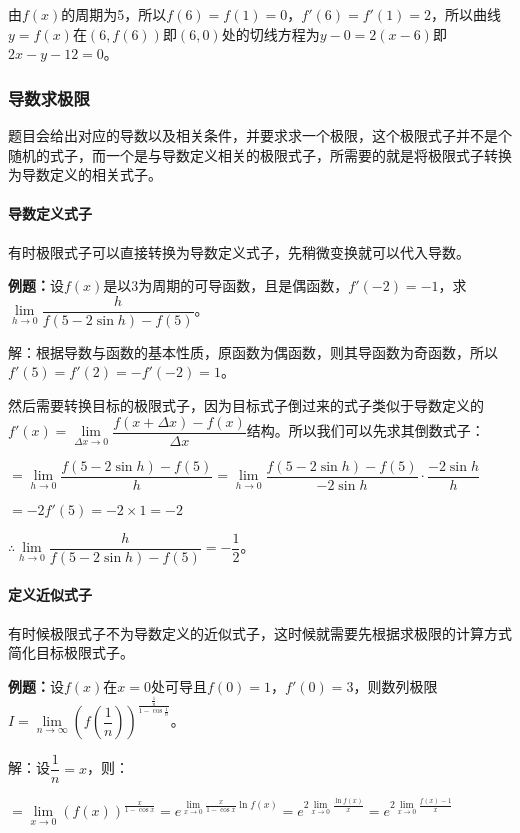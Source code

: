 由$f(x)$的周期为5，所以$f(6)=f(1)=0$，$f'(6)=f'(1)=2$，所以曲线$y=f(x)$在$(6,f(6))$即$(6,0)$处的切线方程为$y-0=2(x-6)$即$2x-y-12=0$。

\subsubsection{导数求极限}

题目会给出对应的导数以及相关条件，并要求求一个极限，这个极限式子并不是个随机的式子，而一个是与导数定义相关的极限式子，所需要的就是将极限式子转换为导数定义的相关式子。

\paragraph{导数定义式子} \leavevmode \medskip

有时极限式子可以直接转换为导数定义式子，先稍微变换就可以代入导数。

\textbf{例题：}设$f(x)$是以3为周期的可导函数，且是偶函数，$f'(-2)=-1$，求$\lim\limits_{h\to 0}\dfrac{h}{f(5-2\sin h)-f(5)}$。\medskip

解：根据导数与函数的基本性质，原函数为偶函数，则其导函数为奇函数，所以$f'(5)=f'(2)=-f'(-2)=1$。

然后需要转换目标的极限式子，因为目标式子倒过来的式子类似于导数定义的$f'(x)=\lim\limits_{\Delta x\to 0}\dfrac{f(x+\Delta x)-f(x)}{\Delta x}$结构。所以我们可以先求其倒数式子：\medskip

$=\lim\limits_{h\to 0}\dfrac{f(5-2\sin h)-f(5)}{h}=\lim\limits_{h\to 0}\dfrac{f(5-2\sin h)-f(5)}{-2\sin h}\cdot\dfrac{-2\sin h}{h}$

$=-2f'(5)=-2\times 1=-2$

$\therefore\lim\limits_{h\to 0}\dfrac{h}{f(5-2\sin h)-f(5)}=-\dfrac{1}{2}$。

\paragraph{定义近似式子} \leavevmode \medskip

有时候极限式子不为导数定义的近似式子，这时候就需要先根据求极限的计算方式简化目标极限式子。

\textbf{例题：}设$f(x)$在$x=0$处可导且$f(0)=1$，$f'(0)=3$，则数列极限$I=\lim\limits_{n\to\infty}\left(f\left(\dfrac{1}{n}\right)\right)^{\frac{\frac{1}{n}}{1-\cos\frac{1}{n}}}$。\medskip

解：设$\dfrac{1}{n}=x$，则：

$=\lim\limits_{x\to 0}(f(x))^{\frac{x}{1-\cos x}}=e^{\lim\limits_{x\to 0}\frac{x}{1-\cos x}\ln f(x)}=e^{2\lim\limits_{x\to 0}\frac{\ln f(x)}{x}}=e^{2\lim\limits_{x\to 0}\frac{f(x)-1}{x}}$


